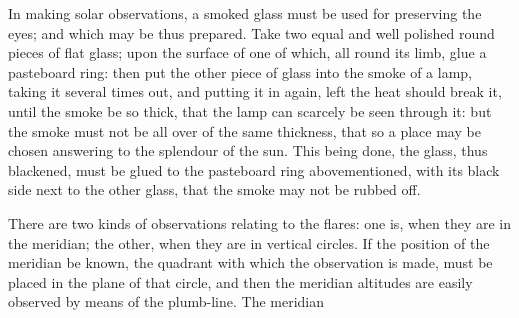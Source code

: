 \documentclass{article}
\begin{document}
In making solar observations, a smoked glass must be used for preserving the eyes; and which may be thus prepared. Take two equal and well polished round pieces of flat glass; upon the surface of one of which, all round its limb, glue a pasteboard ring: then put the other piece of glass into the smoke of a lamp, taking it several times out, and putting it in again, left the heat should break it, until the smoke be so thick, that the lamp can scarcely be seen through it: but the smoke must not be all over of the same thickness, that so a place may be chosen answering to the splendour of the sun. This being done, the glass, thus blackened, must be glued to the pasteboard ring abovementioned, with its black side next to the other glass, that the smoke may not be rubbed off.

There are two kinds of observations relating to the flares: one is, when they are in the meridian; the other, when they are in vertical circles. If the position of the meridian be known, the quadrant with which the observation is made, must be placed in the plane of that circle, and then the meridian altitudes are easily observed by means of the plumb-line. The meridian
\end{document}
